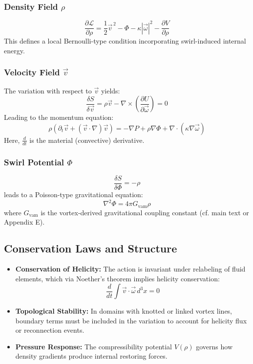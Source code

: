 \subsubsection*{Density Field $\rho$}
\begin{equation}
    \frac{\partial \mathcal{L}}{\partial \rho} = \frac{1}{2} \vec{v}^{\,2} - \Phi - \kappa |\vec{\omega}|^2 - \frac{\partial V}{\partial \rho}
\end{equation}
This defines a local Bernoulli-type condition incorporating swirl-induced internal energy.

\subsubsection*{Velocity Field $\vec{v}$}
The variation with respect to $\vec{v}$ yields:
\begin{equation}
    \frac{\delta S}{\delta \vec{v}} = \rho \vec{v} - \nabla \times \left( \frac{\partial U}{\partial \vec{\omega}} \right) = 0
\end{equation}
Leading to the momentum equation:
\begin{equation}
    \rho \left( \partial_t \vec{v} + (\vec{v} \cdot \nabla)\vec{v} \right) = -\nabla P + \rho \nabla \Phi + \nabla \cdot \left( \kappa \nabla \vec{\omega} \right)
\end{equation}
Here, $\frac{d}{dt}$ is the material (convective) derivative.

\subsubsection*{Swirl Potential $\Phi$}
\begin{equation}
    \frac{\delta S}{\delta \Phi} = -\rho
\end{equation}
leads to a Poisson-type gravitational equation:
\begin{equation}
    \nabla^2 \Phi = 4\pi G_{\mathrm{vam}} \rho
\end{equation}
where $G_{\mathrm{vam}}$ is the vortex-derived gravitational coupling constant (cf. main text or Appendix E).

\subsection*{Conservation Laws and Structure}
\begin{itemize}
    \item \textbf{Conservation of Helicity:}
    The action is invariant under relabeling of fluid elements, which via Noether’s theorem implies helicity conservation:
    \[
        \frac{d}{dt} \int \vec{v} \cdot \vec{\omega} \, d^3x = 0
    \]
    \item \textbf{Topological Stability:} In domains with knotted or linked vortex lines, boundary terms must be included in the variation to account for helicity flux or reconnection events.
    \item \textbf{Pressure Response:} The compressibility potential $V(\rho)$ governs how density gradients produce internal restoring forces.
\end{itemize}

